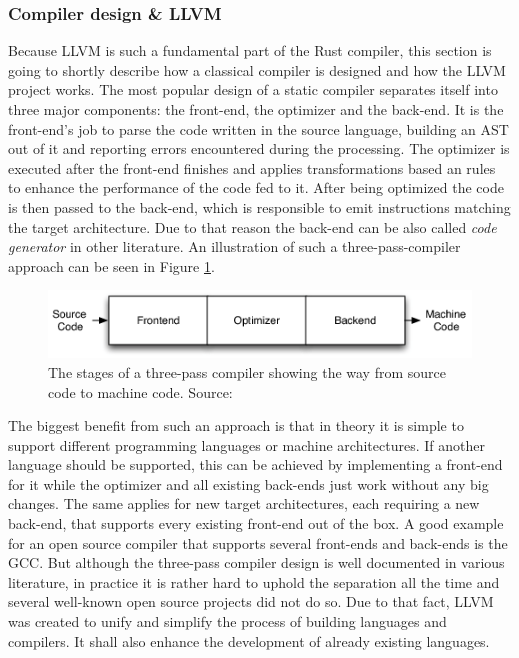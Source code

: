 \subsubsection{Compiler design \& LLVM}

Because \ac{LLVM} is such a fundamental part of the Rust compiler, this section is going to shortly describe how a classical compiler is designed and how the \ac{LLVM} project works.
The most popular design of a static compiler separates itself into three major components: the front-end, the optimizer and the back-end. It is the front-end's job to parse the code written in the source language, building an \ac{AST} out of it and reporting errors encountered during the processing. The optimizer is executed after the front-end finishes and applies transformations based an rules to enhance the performance of the code fed to it. After being optimized the code is then passed to the back-end, which is responsible to emit instructions matching the target architecture. Due to that reason the back-end can be also called \textit{code generator} in other literature. An illustration of such a three-pass-compiler approach can be seen in Figure \ref{fig:compiler_design}.

\begin{figure}[h!]
	\centering \includegraphics[width=\linewidth]{PICs/compiler_design.png}
	\caption{The stages of a three-pass compiler showing the way from source code to machine code. Source: \cite{LLVM_ARCH}}
	\label{fig:compiler_design}
\end{figure}

The biggest benefit from such an approach is that in theory it is simple to support different programming languages or machine architectures. If another language should be supported, this can be achieved by implementing a front-end for it while the optimizer and all existing back-ends just work without any big changes. The same applies for new target architectures, each requiring a new back-end, that supports every existing front-end out of the box. A good example for an open source compiler that supports several front-ends and back-ends is the GCC. But although the three-pass compiler design is well documented in various literature, in practice it is rather hard to uphold the separation all the time and several well-known open source projects did not do so. Due to that fact, \ac{LLVM} was created to unify and simplify the process of building languages and compilers. It shall also enhance the development of already existing languages.

